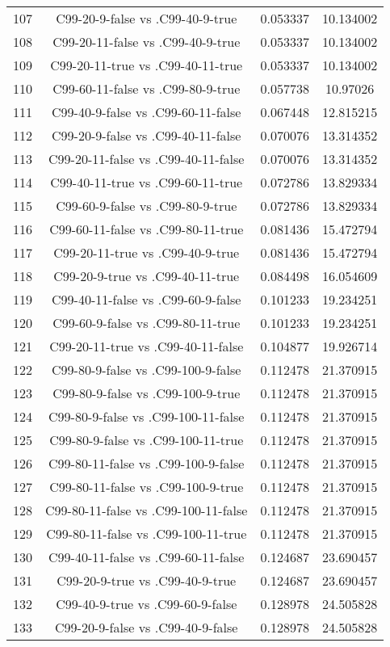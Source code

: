 \documentclass[a4paper,10pt]{article}
\begin{document}
\begin{landscape}
\begin{table}[!htp]
\begin{tabular}{cccc}
107&C99-20-9-false vs .C99-40-9-true&0.053337&10.134002\\
108&C99-20-11-false vs .C99-40-9-true&0.053337&10.134002\\
109&C99-20-11-true vs .C99-40-11-true&0.053337&10.134002\\
110&C99-60-11-false vs .C99-80-9-true&0.057738&10.97026\\
111&C99-40-9-false vs .C99-60-11-false&0.067448&12.815215\\
112&C99-20-9-false vs .C99-40-11-false&0.070076&13.314352\\
113&C99-20-11-false vs .C99-40-11-false&0.070076&13.314352\\
114&C99-40-11-true vs .C99-60-11-true&0.072786&13.829334\\
115&C99-60-9-false vs .C99-80-9-true&0.072786&13.829334\\
116&C99-60-11-false vs .C99-80-11-true&0.081436&15.472794\\
117&C99-20-11-true vs .C99-40-9-true&0.081436&15.472794\\
118&C99-20-9-true vs .C99-40-11-true&0.084498&16.054609\\
119&C99-40-11-false vs .C99-60-9-false&0.101233&19.234251\\
120&C99-60-9-false vs .C99-80-11-true&0.101233&19.234251\\
121&C99-20-11-true vs .C99-40-11-false&0.104877&19.926714\\
122&C99-80-9-false vs .C99-100-9-false&0.112478&21.370915\\
123&C99-80-9-false vs .C99-100-9-true&0.112478&21.370915\\
124&C99-80-9-false vs .C99-100-11-false&0.112478&21.370915\\
125&C99-80-9-false vs .C99-100-11-true&0.112478&21.370915\\
126&C99-80-11-false vs .C99-100-9-false&0.112478&21.370915\\
127&C99-80-11-false vs .C99-100-9-true&0.112478&21.370915\\
128&C99-80-11-false vs .C99-100-11-false&0.112478&21.370915\\
129&C99-80-11-false vs .C99-100-11-true&0.112478&21.370915\\
130&C99-40-11-false vs .C99-60-11-false&0.124687&23.690457\\
131&C99-20-9-true vs .C99-40-9-true&0.124687&23.690457\\
132&C99-40-9-true vs .C99-60-9-false&0.128978&24.505828\\
133&C99-20-9-false vs .C99-40-9-false&0.128978&24.505828\\

\end{tabular}
\end{table}
\end{landscape}
\end{document}
